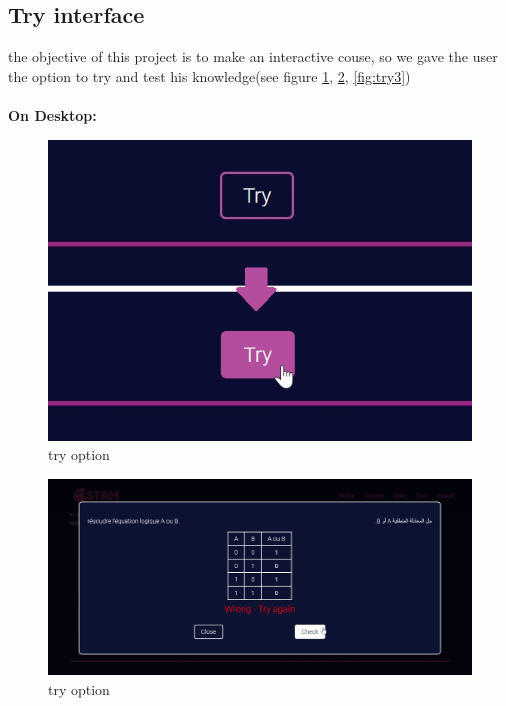 \subsection{Try interface}
the objective of this project is to make an interactive couse, so we gave the user the option to try and test his knowledge(see figure \ref{fig:try1}, \ref{fig:try2}, \ref{fig:try3})\\\\
\textbf{On Desktop:}
\begin{figure}[ht]
	\centering
	\label{}\includegraphics[scale=0.5]{img/13.png}                
	\caption{try option} 
	\label{fig:try1}
\end{figure} 



\newpage

\begin{figure}[ht]
	\centering
	\label{}\includegraphics[scale=0.5]{img/11.png}                
	\caption{try option} 
	\label{fig:try2}
\end{figure} 


